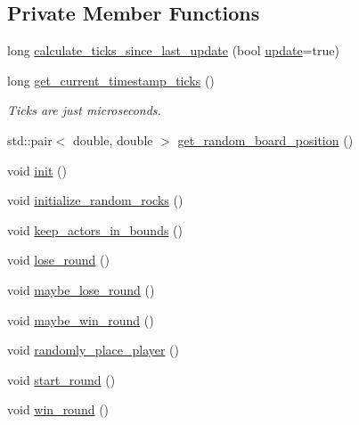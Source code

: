 \subsection*{Private Member Functions}
\begin{DoxyCompactItemize}
\item 
long \hyperlink{classAsteroids_1_1Domain_1_1Game_1_1Game_af8a67c4af1521c3184e873f79aad17f3}{calculate\+\_\+ticks\+\_\+since\+\_\+last\+\_\+update} (bool \hyperlink{classAsteroids_1_1Domain_1_1Game_1_1Game_aa63114be578393b0113f116798346ac4}{update}=true)
\item 
long \hyperlink{classAsteroids_1_1Domain_1_1Game_1_1Game_a0a4efa785b7cdd6b0ef19478f8d34617}{get\+\_\+current\+\_\+timestamp\+\_\+ticks} ()
\begin{DoxyCompactList}\small\item\em Ticks are just microseconds. \end{DoxyCompactList}\item 
std\+::pair$<$ double, double $>$ \hyperlink{classAsteroids_1_1Domain_1_1Game_1_1Game_a798922774fed23c593a476338acf7100}{get\+\_\+random\+\_\+board\+\_\+position} ()
\item 
void \hyperlink{classAsteroids_1_1Domain_1_1Game_1_1Game_a83299855cbf877f34f84b974fc35f8bb}{init} ()
\item 
void \hyperlink{classAsteroids_1_1Domain_1_1Game_1_1Game_ad3a7040e8cc0b14228f46577ecf2bc78}{initialize\+\_\+random\+\_\+rocks} ()
\item 
void \hyperlink{classAsteroids_1_1Domain_1_1Game_1_1Game_a594494581cf464eafb2842cb98387819}{keep\+\_\+actors\+\_\+in\+\_\+bounds} ()
\item 
void \hyperlink{classAsteroids_1_1Domain_1_1Game_1_1Game_aca6a4c9568d4bffcd9b1ff331c338abb}{lose\+\_\+round} ()
\item 
void \hyperlink{classAsteroids_1_1Domain_1_1Game_1_1Game_a5b851b86192080f5f59d61f689bf97a4}{maybe\+\_\+lose\+\_\+round} ()
\item 
void \hyperlink{classAsteroids_1_1Domain_1_1Game_1_1Game_abf55b1a7206729ce7e384bc8e6cb73d0}{maybe\+\_\+win\+\_\+round} ()
\item 
void \hyperlink{classAsteroids_1_1Domain_1_1Game_1_1Game_a5de32d7dcb5350720e625be3d40cee54}{randomly\+\_\+place\+\_\+player} ()
\item 
void \hyperlink{classAsteroids_1_1Domain_1_1Game_1_1Game_aa242712e038fce29760d53eb1d57c9fb}{start\+\_\+round} ()
\item 
void \hyperlink{classAsteroids_1_1Domain_1_1Game_1_1Game_ac3e1c5498adb64ea278d1a4b69db412b}{win\+\_\+round} ()
\end{DoxyCompactItemize}
